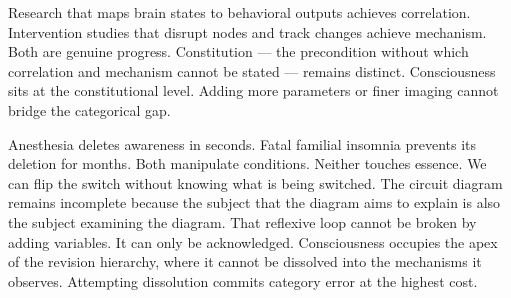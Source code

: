 Research that maps brain states to behavioral outputs achieves correlation. Intervention studies that disrupt nodes and track changes achieve mechanism. Both are genuine progress. Constitution — the precondition without which correlation and mechanism cannot be stated — remains distinct. Consciousness sits at the constitutional level. Adding more parameters or finer imaging cannot bridge the categorical gap.

Anesthesia deletes awareness in seconds. Fatal familial insomnia prevents its deletion for months. Both manipulate conditions. Neither touches essence. We can flip the switch without knowing what is being switched. The circuit diagram remains incomplete because the subject that the diagram aims to explain is also the subject examining the diagram. That reflexive loop cannot be broken by adding variables. It can only be acknowledged. Consciousness occupies the apex of the revision hierarchy, where it cannot be dissolved into the mechanisms it observes. Attempting dissolution commits category error at the highest cost.


